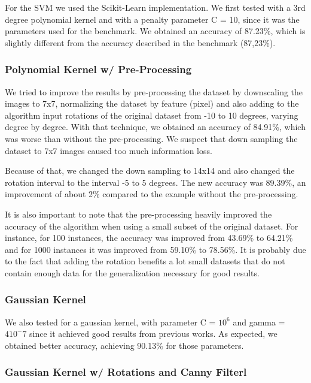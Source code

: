 \documentclass[twoside,twocolumn]{article}
\begin{document}
For the SVM we used the Scikit-Learn implementation. We first tested with a 3rd degree polynomial kernel and with a penalty parameter C = 10, since
it was the parameters used for the benchmark. We obtained an accuracy of 87.23\%, which is slightly different from the accuracy described in the benchmark (87,23\%).

\subsubsection{Polynomial Kernel w/ Pre-Processing}

We tried to improve the results by pre-processing the dataset by downscaling the images to 7x7, normalizing the dataset by feature (pixel) and also adding
to the algorithm input rotations of the original dataset from -10 to 10 degrees, varying degree by degree.
With that technique, we obtained an accuracy of 84.91\%, which was worse than without the pre-processing. We suspect that down sampling the dataset
to 7x7 images caused too much information loss.

Because of that, we changed the down sampling to 14x14 and also changed the rotation interval to the interval -5 to 5 degrees.
The new accuracy was 89.39\%, an improvement of about 2\% compared to the example without the pre-processing.

It is also important to note that the pre-processing heavily improved the accuracy of the algorithm when using a small subset of the
original dataset. For instance, for 100 instances, the accuracy was improved from 43.69\% to 64.21\% and for 1000 instances it was
improved from 59.10\% to 78.56\%. It is probably due to the fact that adding the rotation benefits a lot small datasets that do not contain
enough data for the generalization necessary for good results.

\subsubsection{Gaussian Kernel}

We also tested for a gaussian kernel, with parameter C = $10^6$ and gamma = $4 10^-7$ since it achieved good results from previous works.
As expected, we obtained better accuracy, achieving 90.13\% for those parameters.

\subsubsection{Gaussian Kernel w/ Rotations and Canny Filterl}
\end{document}
